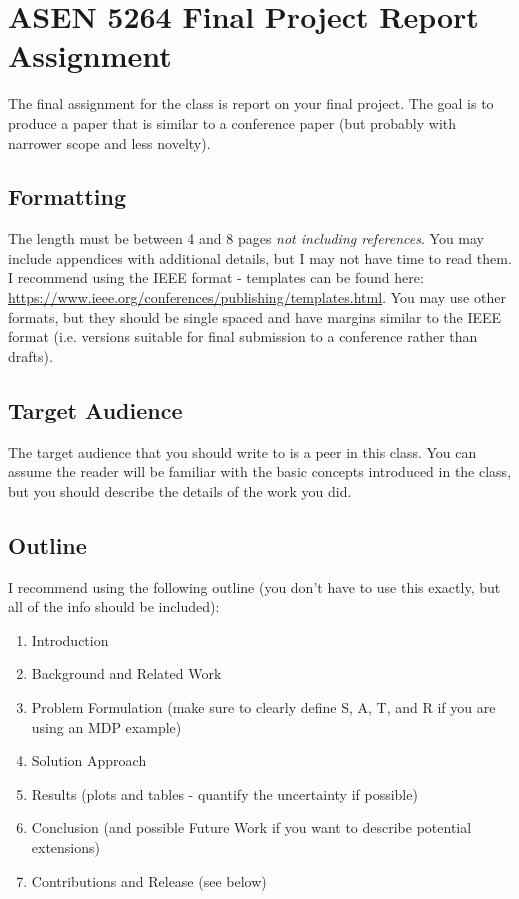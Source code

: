 \documentclass{article}
\begin{document}
\section*{ASEN 5264 Final Project Report Assignment}

The final assignment for the class is report on your final project. The goal is to produce a paper that is similar to a conference paper (but probably with narrower scope and less novelty).

\subsection*{Formatting}

The length must be between 4 and 8 pages \emph{not including references}. You may include appendices with additional details, but I may not have time to read them. I recommend using the IEEE format - templates can be found here: \url{https://www.ieee.org/conferences/publishing/templates.html}. You may use other formats, but they should be single spaced and have margins similar to the IEEE format (i.e. versions suitable for final submission to a conference rather than drafts).

\subsection*{Target Audience}

The target audience that you should write to is a peer in this class. You can assume the reader will be familiar with the basic concepts introduced in the class, but you should describe the details of the work you did.

\subsection*{Outline}

I recommend using the following outline (you don't have to use this exactly, but all of the info should be included):

\begin{enumerate}[nosep]
    \item Introduction
    \item Background and Related Work
    \item Problem Formulation (make sure to clearly define S, A, T, and R if you are using an MDP example)
    \item Solution Approach
    \item Results (plots and tables - quantify the uncertainty if possible)
    \item Conclusion (and possible Future Work if you want to describe potential extensions)
    \item Contributions and Release (see below)
\end{enumerate}
\end{document}
